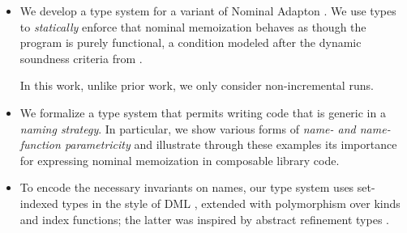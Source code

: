 \documentclass{purple}
\begin{document}
\begin{itemize}
\item We develop a type system for a variant of Nominal Adapton
  \citep{Hammer15:names}. 
%
We use types to \emph{statically} enforce that nominal
memoization behaves as though the program is purely functional, a
condition modeled after the dynamic soundness criteria from
\citep{Hammer15:names}.

In this work, unlike prior work, we only consider non-incremental runs.

\item 
  We formalize a type system that permits writing code that is generic
  in a \emph{naming strategy}.  In particular, we show various forms
  of \emph{name- and name-function parametricity} and illustrate through these
  examples its importance for expressing nominal memoization in
  composable library code.

\item To encode the necessary invariants on names, our type system
  uses set-indexed types in the style of DML \citep{Xi99popl}, extended with
  polymorphism over kinds and index functions; the latter was inspired by
  abstract refinement types \citep{Vazou13}.

  



\end{itemize}
\end{document}
